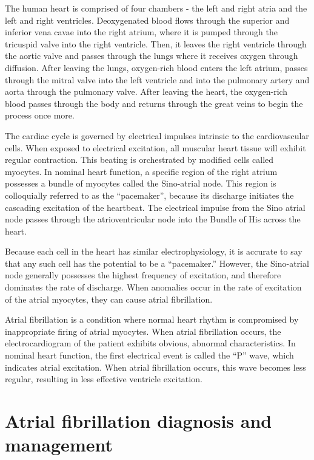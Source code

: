 \documentclass[letterpaper,10pt,conference]{ieeeconf}   %
\begin{document}
The human heart is comprised of four chambers - the left and right atria and the left and right ventricles. Deoxygenated blood flows through the superior and inferior vena cavae into the right atrium, where it is pumped through the tricuspid valve into the right ventricle. Then, it leaves the right ventricle through the aortic valve and passes through the lungs where it receives oxygen through diffusion. After leaving the lungs, oxygen-rich blood enters the left atrium, passes through the mitral valve into the left ventricle and into the pulmonary artery and aorta through the pulmonary valve. After leaving the heart, the oxygen-rich blood passes through the body and returns through the great veins to begin the process once more. 

The cardiac cycle is governed by electrical impulses intrinsic to the cardiovascular cells. When exposed to electrical excitation, all muscular heart tissue will exhibit regular contraction. This beating is orchestrated by modified cells called myocytes. In nominal heart function, a specific region of the right atrium possesses a bundle of myocytes called the Sino-atrial node. This region is colloquially referred to as the ``pacemaker'', because its discharge initiates the cascading excitation of the heartbeat. The electrical impulse from the Sino atrial node passes through the atrioventricular node into the Bundle of His across the heart. 

Because each cell in the heart has similar electrophysiology, it is accurate to say that any such cell has the potential to be a ``pacemaker.'' However, the Sino-atrial node generally possesses the highest frequency of excitation, and therefore dominates the rate of discharge. When anomalies occur in the rate of excitation of the atrial myocytes, they can cause atrial fibrillation. 

Atrial fibrillation is a condition where normal heart rhythm is compromised by inappropriate firing of atrial myocytes. When atrial fibrillation occurs, the electrocardiogram of the patient exhibits obvious, abnormal characteristics. In nominal heart function, the first electrical event is called the “P” wave, which indicates atrial excitation. When atrial fibrillation occurs, this wave becomes less regular, resulting in less effective ventricle excitation.

\section{Atrial fibrillation diagnosis and management}
\label{sec:diagnosisandmanagement}
\end{document}
